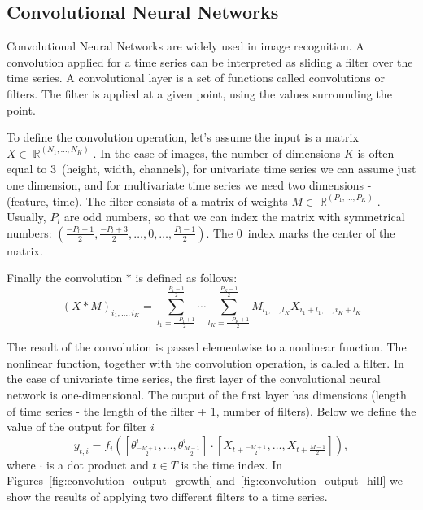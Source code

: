 \documentclass[a4paper,11pt,twoside]{report}
\theoremstyle{definition}
\DeclareMathOperator{\real}{\mathbb{R}}
\begin{document}
\subsection{Convolutional Neural Networks}
Convolutional Neural Networks are widely used in image recognition. A convolution applied for a time series can be interpreted as sliding a filter over the time series. A convolutional layer is a set of functions called convolutions or filters. The filter is applied at a given point, using the values surrounding the point.

To define the convolution operation, let's assume the input is a matrix $X \in \real^{(N_1, \dots, N_K)}$. In the case of images, the number of dimensions $K$ is often equal to $3$~(height, width, channels), for univariate time series we can assume just one dimension, and for multivariate time series we need two dimensions - (feature, time).
The filter consists of a matrix of weights $M \in \real^{(P_1, \dots, P_K)}$.
Usually, $P_l$ are odd numbers, so that we can index the matrix with symmetrical numbers: $ (\frac{-P_l+1}{2},  \frac{-P_l+3}{2}, \dots, 0, \dots, \frac{P_l-1}{2})$. The $0$~index marks the center of the matrix.


Finally the convolution $*$ is defined as follows:
$$(X*M)_{i_1, \dots, i_K} = \sum_{l_1=\frac{-P_1+1}{2}}^{\frac{P_1-1}{2}} \cdots \sum_{l_K=\frac{-P_K+1}{2}}^{\frac{P_K-1}{2}} M_{l_1, \dots, l_K} X_{i_1 + l_1, \dots, i_K + l_K}$$

The result of the convolution is passed elementwise to a nonlinear function. The nonlinear function, together with the convolution operation, is called a filter.
In the case of univariate time series, the first layer of the convolutional neural network is one-dimensional. The output of the first layer has dimensions (length of time series - the length of the filter + 1, number of filters). Below we define the value of the output for filter $i$
$$ y_{t, i} = f_i([\theta_{\frac{-M+1}{2}}^i, \dots , \theta_{\frac{M-1}{2}}^i] \cdot [X_{t+\frac{-M+1}{2}}, \dots, X_{t+\frac{M-1}{2}}]),$$
where $\cdot$ is a dot product and $t \in T$ is the time index.
In Figures~\ref{fig:convolution_output_growth} and~\ref{fig:convolution_output_hill} we show the results of applying two different filters to a time series.


\FloatBarrier
\end{document}
